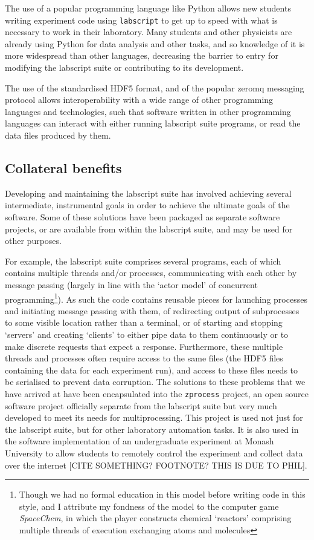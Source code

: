 The use of a popular programming language like Python allows new students writing experiment code using \texttt{labscript} to get up to speed with what is necessary to work in their laboratory. Many students and other physicists are already using Python for data analysis and other tasks, and so knowledge of it is more widespread than other languages, decreasing the barrier to entry for modifying the labscript suite or contributing to its development.

The use of the standardised HDF5 format, and of the popular zeromq messaging protocol allows interoperability with a wide range of other programming languages and technologies, such that software written in other programming languages can interact with either running labscript suite programs, or read the data files produced by them.


\subsection{Collateral benefits}

Developing and maintaining the labscript suite has involved achieving several intermediate, instrumental goals in order to achieve the ultimate goals of the software. Some of these solutions have been packaged as separate software projects, or are available from within the labscript suite, and may be used for other purposes.

For example, the labscript suite comprises several programs, each of which contains multiple threads and/or processes, communicating with each other by message passing (largely in line with the `actor model' of concurrent programming\footnote{Though we had no formal education in this model before writing code in this style, and I attribute my fondness of the model to the computer game \emph{SpaceChem}, in which the player constructs chemical `reactors' comprising multiple threads of execution exchanging atoms and molecules}). As such the code contains reusable pieces for launching processes and initiating message passing with them, of redirecting output of subprocesses to some visible location rather than a terminal, or of starting and stopping `servers' and creating `clients' to either pipe data to them continuously or to make discrete requests that expect a response. Furthermore, these multiple threads and processes often require access to the same files (the HDF5 files containing the data for each experiment run), and access to these files needs to be serialised to prevent data corruption. The solutions to these problems that we have arrived at have been encapsulated into the \texttt{zprocess} project, an open source software project officially separate from the labscript suite but very much developed to meet its needs for multiprocessing. This project is used not just for the labscript suite, but for other laboratory automation tasks. It is also used in the software implementation of an undergraduate experiment at Monash University to allow students to remotely control the experiment and collect data over the internet [CITE SOMETHING? FOOTNOTE? THIS IS DUE TO PHIL].

